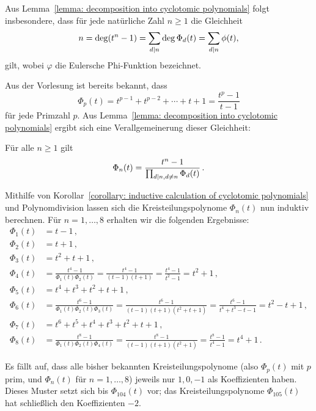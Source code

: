 \begin{remark}
  Aus Lemma~\ref{lemma: decomposition into cyclotomic polynomials} folgt insbesondere, dass für jede natürliche Zahl $n \geq 1$ die Gleichheit
  \[
      n
    = \deg(t^n - 1)
    = \sum_{d \mathrel{|} n} \deg \Phi_d(t)
    = \sum_{d \mathrel{|} n} \phi(t),
  \]
  gilt, wobei $\varphi$ die Eulersche Phi-Funktion bezeichnet.
\end{remark}

Aus der Vorlesung ist bereits bekannt, dass
\[
    \Phi_p(t)
  = t^{p-1} + t^{p-2} + \dotsb + t + 1
  = \frac{t^p - 1}{t-1}
\]
für jede Primzahl $p$.
Aus Lemma~\ref{lemma: decomposition into cyclotomic polynomials} ergibt sich eine Verallgemeinerung dieser Gleichheit:

\begin{corollary}
  \label{corollary: inductive calculation of cyclotomic polynomials}
  Für alle $n \geq 1$ gilt
  \[
      \Phi_n(t)
    = \frac{t^n - 1}{\prod_{d \mathrel{|} n, d \neq n} \Phi_d(t)}\,.
  \]
\end{corollary}

Mithilfe von Korollar~\ref{corollary: inductive calculation of cyclotomic polynomials} und Polynomdivision lassen sich die Kreisteilungspolynome $\Phi_n(t)$ nun induktiv berechnen.
Für $n = 1, \dotsc, 8$ erhalten wir die folgenden Ergebnisse:
\begin{align*}
      \Phi_1(t)
  &=  t-1\,,
  \\
      \Phi_2(t)
  &=  t+1\,,
  \\
      \Phi_3(t)
  &=  t^2 + t + 1\,,
  \\
      \Phi_4(t)
  &=  \frac{t^4 - 1}{\Phi_1(t) \Phi_2(t)}
   =  \frac{t^4 - 1}{(t-1)(t+1)}
   =  \frac{t^4 - 1}{t^2 - 1}
   =  t^2 + 1\,,
  \\
      \Phi_5(t)
  &=  t^4 + t^3 + t^2 + t + 1\,,
  \\
      \Phi_6(t)
  &=  \frac{t^6 - 1}{\Phi_1(t) \Phi_2(t) \Phi_3(t)}
   =  \frac{t^6 - 1}{(t-1)(t+1)(t^2 + t + 1)}
   =  \frac{t^6 - 1}{t^4 + t^3 - t - 1}
   =  t^2 - t + 1\,,
  \\
      \Phi_7(t)
  &=  t^6 + t^5 + t^4 + t^3 + t^2 + t + 1\,,
  \\
      \Phi_8(t)
  &=  \frac{t^8 - 1}{\Phi_1(t) \Phi_2(t) \Phi_4(t)}
   =  \frac{t^8 - 1}{(t-1)(t+1)(t^2 + 1)}
   =  \frac{t^8 - 1}{t^4 - 1}
   =  t^4 +1\,.
\end{align*}

\begin{remark}
  Es fällt auf, dass alle bisher bekannten Kreisteilungspolynome (also $\Phi_p(t)$ mit $p$ prim, und $\Phi_n(t)$ für $n = 1, \dotsc, 8$) jeweils nur $1, 0, -1$ als Koeffizienten haben.
  Dieses Muster setzt sich bis $\Phi_{104}(t)$ vor; das Kreisteilungspolynome $\Phi_{105}(t)$ hat schließlich den Koeffizienten $-2$.
\end{remark}
